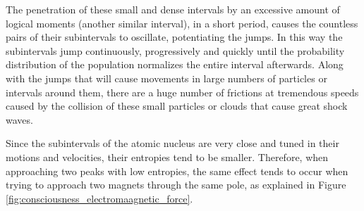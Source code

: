 The penetration of these small and dense intervals by an excessive amount of logical moments (another similar interval), in a short period, causes the countless pairs of their subintervals to oscillate, potentiating the jumps. In this way the subintervals jump continuously, progressively and quickly until the probability distribution of the population normalizes the entire interval afterwards. Along with the jumps that will cause movements in large numbers of particles or intervals around them, there are a huge number of frictions at tremendous speeds caused by the collision of these small particles or clouds that cause great shock waves.

Since the subintervals of the atomic nucleus are very close and tuned in their motions and velocities, their entropies tend to be smaller. Therefore, when approaching two peaks with low entropies, the same effect tends to occur when trying to approach two magnets through the same pole, as explained in Figure \ref{fig:consciousness_electromaagnetic_force}.

